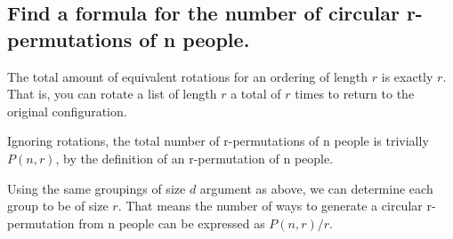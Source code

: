 \subsection{Find a formula for the number of circular r-permutations of n people.}
The total amount of equivalent rotations for an ordering of length $r$ is exactly $r$. That is, you can rotate a list of length $r$ a total of $r$ times to return to the original configuration.

Ignoring rotations, the total number of r-permutations of n people is trivially $P(n,r)$, by the definition of an r-permutation of n people.

Using the same groupings of size $d$ argument as above, we can determine each group to be of size $r$. That means the number of ways to generate a circular r-permutation from n people can be expressed as $P(n,r) / r$. 
